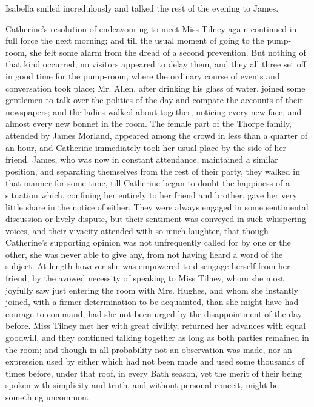 
Isabella smiled incredulously and talked the rest of the evening to James.

Catherine's resolution of endeavouring to meet Miss Tilney again continued in full force the next morning; and till the usual moment of going to the pump-room, she felt some alarm from the dread of a second prevention. But nothing of that kind occurred, no visitors appeared to delay them, and they all three set off in good time for the pump-room, where the ordinary course of events and conversation took place; Mr. Allen, after drinking his glass of water, joined some gentlemen to talk over the politics of the day and compare the accounts of their newspapers; and the ladies walked about together, noticing every new face, and almost every new bonnet in the room. The female part of the Thorpe family, attended by James Morland, appeared among the crowd in less than a quarter of an hour, and Catherine immediately took her usual place by the side of her friend. James, who was now in constant attendance, maintained a similar position, and separating themselves from the rest of their party, they walked in that manner for some time, till Catherine began to doubt the happiness of a situation which, confining her entirely to her friend and brother, gave her very little share in the notice of either. They were always engaged in some sentimental discussion or lively dispute, but their sentiment was conveyed in such whispering voices, and their vivacity attended with so much laughter, that though Catherine's supporting opinion was not unfrequently called for by one or the other, she was never able to give any, from not having heard a word of the subject. At length however she was empowered to disengage herself from her friend, by the avowed necessity of speaking to Miss Tilney, whom she most joyfully saw just entering the room with Mrs. Hughes, and whom she instantly joined, with a firmer determination to be acquainted, than she might have had courage to command, had she not been urged by the disappointment of the day before. Miss Tilney met her with great civility, returned her advances with equal goodwill, and they continued talking together as long as both parties remained in the room; and though in all probability not an observation was made, nor an expression used by either which had not been made and used some thousands of times before, under that roof, in every Bath season, yet the merit of their being spoken with simplicity and truth, and without personal conceit, might be something uncommon.

